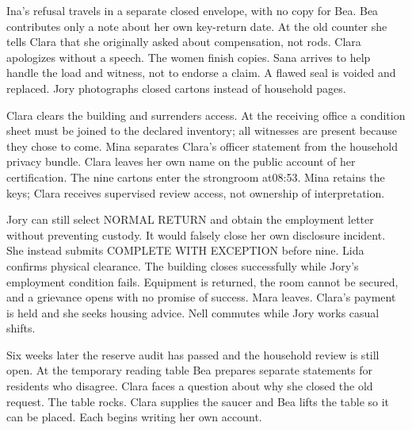 Ina's refusal travels in a separate closed envelope, with no copy for Bea. Bea contributes only a note about her own key-return date. At the old counter she tells Clara that she originally asked about compensation, not rods. Clara apologizes without a speech. The women finish copies. Sana arrives to help handle the load and witness, not to endorse a claim. A flawed seal is voided and replaced. Jory photographs closed cartons instead of household pages.

Clara clears the building and surrenders access. At the receiving office a condition sheet must be joined to the declared inventory; all witnesses are present because they chose to come. Mina separates Clara's officer statement from the household privacy bundle. Clara leaves her own name on the public account of her certification. The nine cartons enter the strongroom at08:53. Mina retains the keys; Clara receives supervised review access, not ownership of interpretation.

Jory can still select NORMAL RETURN and obtain the employment letter without preventing custody. It would falsely close her own disclosure incident. She instead submits COMPLETE WITH EXCEPTION before nine. Lida confirms physical clearance. The building closes successfully while Jory's employment condition fails. Equipment is returned, the room cannot be secured, and a grievance opens with no promise of success. Mara leaves. Clara's payment is held and she seeks housing advice. Nell commutes while Jory works casual shifts.

Six weeks later the reserve audit has passed and the household review is still open. At the temporary reading table Bea prepares separate statements for residents who disagree. Clara faces a question about why she closed the old request. The table rocks. Clara supplies the saucer and Bea lifts the table so it can be placed. Each begins writing her own account.

